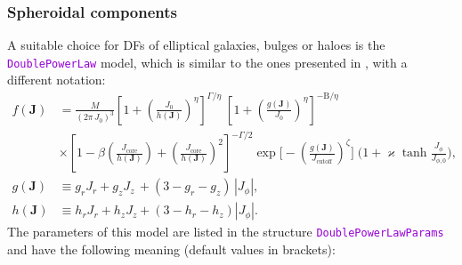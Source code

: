\documentclass[12pt]{article}
\newcommand{\ttt}[1]{\textcolor{darkviolet}{\texttt{#1}}}
\newcommand{\bJ}{\boldsymbol{J}}
\newcommand{\Beta}{\mathrm B}
\begin{document}
\subsubsection{Spheroidal components}  \label{sec:DFspheroid}

A suitable choice for DFs of elliptical galaxies, bulges or haloes is the \ttt{DoublePowerLaw} model, which is similar to the ones presented in \cite{Binney2014, Posti2015}, with a different notation:
\begin{align*}
f(\bJ) &= \frac{M}{(2\pi\, J_0)^3}
\left[1 + \left(\frac{J_0}{h(\bJ)}\right)^\eta \right]^{\Gamma / \eta} \;
\left[1 + \left(\frac{g(\bJ)}{J_0}\right)^\eta \right]^{-\Beta / \eta} \\
&\times
\left[1 - \beta\left(\frac{J_\mathrm{core}}{h(\bJ)}\right) + 
\left(\frac{J_\mathrm{core}}{h(\bJ)}\right)^2 \right]^{-\Gamma/2}
\exp\bigg[-\left(\frac{g(\bJ)}{J_\mathrm{cutoff}}\right)^\zeta\bigg] \;
\bigg(1 + \varkappa\tanh \frac{J_\phi}{J_{\phi,0}} \bigg), \\
g(\bJ) &\equiv g_r J_r + g_z J_z\, + (3-g_r-g_z)\, |J_\phi|, \\
h(\bJ) &\equiv h_r J_r + h_z J_z   + (3-h_r-h_z)   |J_\phi|.
\end{align*}
The parameters of this model are listed in the structure \ttt{DoublePowerLawParams} and have the following meaning (default values in brackets):
\end{document}
